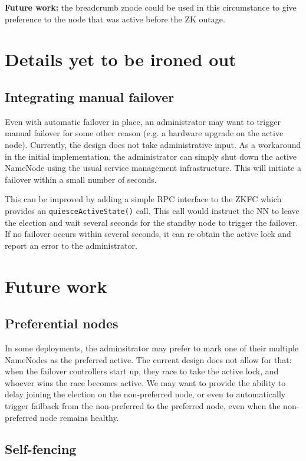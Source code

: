 \documentclass{article}
\begin{document}
{\bf Future work:} the breadcrumb znode could be used in this circumstance to give preference to the node that was active before the ZK outage.

\section{Details yet to be ironed out}

\subsection{Integrating manual failover}
Even with automatic failover in place, an administrator may want to trigger manual failover for some other reason (e.g. a hardware upgrade on the active node). Currently, the design does not take administrative input. As a workaround in the initial implementation, the administrator can simply shut down the active NameNode using the usual service management infrastructure. This will initiate a failover within a small number of seconds.

This can be improved by adding a simple RPC interface to the ZKFC which provides an {\tt quiesceActiveState()} call. This call would instruct the NN to leave the election and wait several seconds for the standby node to trigger the failover. If no failover occurs within several seconds, it can re-obtain the active lock and report an error to the administrator.

\section{Future work}

\subsection{Preferential nodes}
In some deployments, the adminsitrator may prefer to mark one of their multiple NameNodes as the preferred active. The current design does not allow for that: when the failover controllers start up, they race to take the active lock, and whoever wins the race becomes active. We may want to provide the ability to delay joining the election on the non-preferred node, or even to automatically trigger failback from the non-preferred to the preferred node, even when the non-preferred node remains healthy.

\subsection{Self-fencing}
\end{document}
